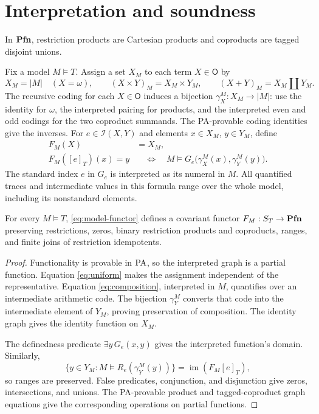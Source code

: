 \section{Interpretation and soundness}\label{sec:models}

In $\mathbf{Pfn}$, restriction products are Cartesian products and coproducts
are tagged disjoint unions.

Fix a model $M\models T$. Assign a set $X_M$ to each term
$X\in\mathsf O$ by
\[
 X_M=|M|\quad(X=\omega),\qquad
 (X\times Y)_M=X_M\times Y_M,\qquad
 (X+Y)_M=X_M\amalg Y_M.
\]
The recursive coding for each $X\in\mathsf O$ induces a bijection
$\gamma_X^M:X_M\to|M|$: use the identity for $\omega$, the
interpreted pairing for products, and the interpreted even and odd
codings for the two coproduct summands. The PA-provable coding
identities give the inverses. For $e\in\mathcal I(X,Y)$
and elements $x\in X_M$, $y\in Y_M$, define
\begin{equation}\label{eq:model-functor}
 \begin{aligned}
 F_M(X)&=X_M,\\
 F_M([e]_T)(x)=y
 &\quad\Longleftrightarrow\quad
 M\models G_e\bigl(\gamma_X^M(x),\gamma_Y^M(y)\bigr).
 \end{aligned}
\end{equation}
The standard index $e$ in $G_e$ is interpreted as its numeral in $M$.
All quantified traces and intermediate values in this formula range over
the whole model, including its nonstandard elements.

\begin{proposition}\label{prop:model}
For every $M\models T$, \eqref{eq:model-functor} defines a covariant
functor $F_M:S_T\to\mathbf{Pfn}$ preserving restrictions, zeros, binary
restriction products and coproducts, ranges, and finite joins of
restriction idempotents.
\end{proposition}
\begin{proof}
Functionality is provable in $\mathrm{PA}$, so the interpreted graph is a
partial function. Equation \eqref{eq:uniform} makes the assignment
independent of the representative. Equation \eqref{eq:composition},
interpreted in $M$, quantifies over an intermediate arithmetic code.
The bijection $\gamma_Y^M$ converts that code into the intermediate
element of $Y_M$, proving preservation of composition. The identity
graph gives the identity function on $X_M$.

The definedness predicate $\exists y\,G_e(x,y)$ gives the interpreted
function's domain. Similarly,
\[
 \{y\in Y_M:M\models R_e(\gamma_Y^M(y))\}
 =\operatorname{im}(F_M[e]_T),
\]
so ranges are preserved. False predicates, conjunction, and disjunction
give zeros, intersections, and unions. The PA-provable product and
tagged-coproduct graph equations give the corresponding operations on
partial functions.
\end{proof}

